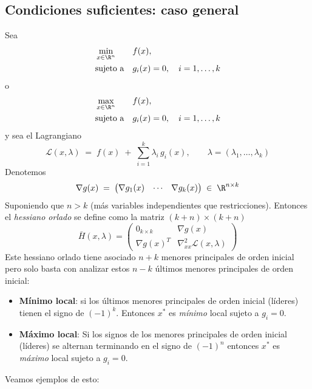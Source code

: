 \documentclass{article}
\begin{document}
\subsection*{Condiciones suficientes: caso general}

Sea
\[
\begin{aligned}
&\min_{x\in\R^n} && f(x),\\
&\text{sujeto a} && g_i(x)=0,\quad i=1,\dots,k
\end{aligned}\]
o
\\
\[
\begin{aligned}
&\max_{x\in\R^n} && f(x),\\
&\text{sujeto a} && g_i(x)=0,\quad i=1,\dots,k
\end{aligned}
\]
y sea el Lagrangiano
\[
\mathcal L(x,\lambda)
\;=\;
f(x)\;+\;\sum_{i=1}^k\lambda_i\,g_i(x),
\qquad
\lambda=(\lambda_1,\dots,\lambda_k)
\]
Denotemos
\[
\nabla g(x)
\;=\;
\begin{pmatrix}
\nabla g_1(x) & \cdots & \nabla g_k(x)
\end{pmatrix}
\;\in\;\R^{n\times k}
\]
Suponiendo que $n>k$ (más variables independientes que restricciones). Entonces el \emph{hessiano orlado} se define como la matriz  
\((k+n)\times(k+n)\)
\[
\bar{H}(x,\lambda)
=
\begin{pmatrix}
0_{k\times k} & \nabla g(x)\\[6pt]
\nabla g(x)^{T}  & \nabla^2_{xx}\mathcal L(x,\lambda)
\end{pmatrix}
\]
Este hessiano orlado tiene asociado $n+k$ menores principales de orden inicial pero solo basta con analizar estos \(n-k\) últimos menores principales de orden inicial:

\begin{itemize}\color{teal}
  \item \textbf{Mínimo local}: si los últimos menores principales de orden inicial (líderes) tienen el signo de $(-1)^k$. Entonces \(x^*\) es \emph{mínimo} local sujeto a \(g_i=0\).
  \item \textbf{Máximo local}: Si los signos de los menores principales de orden inicial (líderes) se alternan terminando en el signo de $(-1)^n$ entonces \(x^*\) es \emph{máximo} local sujeto a \(g_i=0\).
\end{itemize}

Veamos ejemplos de esto:
\end{document}
